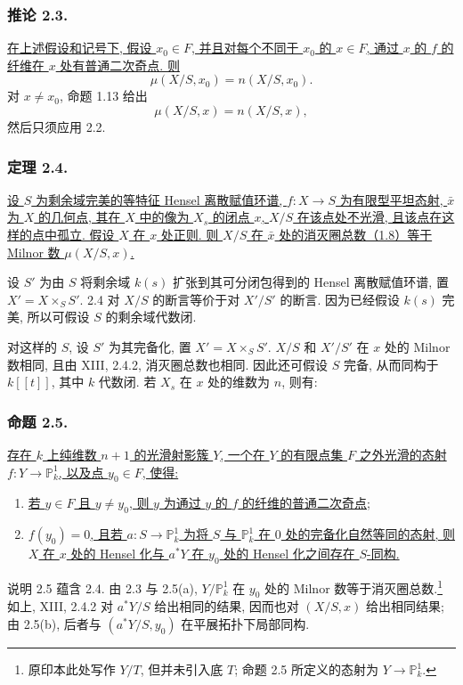 \subsubsection*{推论 2.3.}
\underline{在上述假设和记号下, 假设 $x_0\in F$, 并且对每个不同于 $x_0$ 的 $x\in F$, 通过 $x$ 的 $f$ 的纤维在 $x$ 处有普通二次奇点. 则}
\[
\mu(X/S,x_0)=n(X/S,x_0).
\]
对 $x\ne x_0$, 命题 1.13 给出
\[
\mu(X/S,x)=n(X/S,x),
\]
然后只须应用 2.2.

\subsubsection*{定理 2.4.}
\underline{设 $S$ 为剩余域完美的等特征 Hensel 离散赋值环谱, $f:X\to S$ 为有限型平坦态射, $\bar x$ 为 $X$ 的几何点, 其在 $X$ 中的像为 $X_s$ 的闭点 $x$, $X/S$ 在该点处不光滑, 且该点在这样的点中孤立. 假设 $X$ 在 $x$ 处正则. 则 $X/S$ 在 $\bar x$ 处的消灭圈总数（1.8）等于 Milnor 数 $\mu(X/S,x)$.}

设 $S'$ 为由 $S$ 将剩余域 $k(s)$ 扩张到其可分闭包得到的 Hensel 离散赋值环谱, 置 $X'=X\times_S S'$. 2.4 对 $X/S$ 的断言等价于对 $X'/S'$ 的断言. 因为已经假设 $k(s)$ 完美, 所以可假设 $S$ 的剩余域代数闭.

对这样的 $S$, 设 $S'$ 为其完备化, 置 $X'=X\times_S S'$. $X/S$ 和 $X'/S'$ 在 $x$ 处的 Milnor 数相同, 且由 XIII, 2.4.2, 消灭圈总数也相同. 因此还可假设 $S$ 完备, 从而同构于 $k[[t]]$, 其中 $k$ 代数闭. 若 $X_s$ 在 $x$ 处的维数为 $n$, 则有:

\subsubsection*{命题 2.5.}
\underline{存在 $k$ 上纯维数 $n+1$ 的光滑射影簇 $Y$, 一个在 $Y$ 的有限点集 $F$ 之外光滑的态射 $f:Y\to\mathbb P^1_k$, 以及点 $y_0\in F$, 使得:}
\begin{enumerate}
\item[(a)] \underline{若 $y\in F$ 且 $y\ne y_0$, 则 $y$ 为通过 $y$ 的 $f$ 的纤维的普通二次奇点;}
\item[(b)] \underline{$f(y_0)=0$, 且若 $a:S\to\mathbb P^1_k$ 为将 $S$ 与 $\mathbb P^1_k$ 在 $0$ 处的完备化自然等同的态射, 则 $X$ 在 $x$ 处的 Hensel 化与 $a^*Y$ 在 $y_0$ 处的 Hensel 化之间存在 $S$-同构.}
\end{enumerate}

说明 2.5 蕴含 2.4. 由 2.3 与 2.5(a), $Y/\mathbb P^1_k$ 在 $y_0$ 处的 Milnor 数等于消灭圈总数.\footnote{原印本此处写作 $Y/T$, 但并未引入底 $T$; 命题 2.5 所定义的态射为 $Y\to\mathbb P^1_k$.}
如上, XIII, 2.4.2 对 $a^*Y/S$ 给出相同的结果, 因而也对 $(X/S,x)$ 给出相同结果; 由 2.5(b), 后者与 $(a^*Y/S,y_0)$ 在平展拓扑下局部同构.
